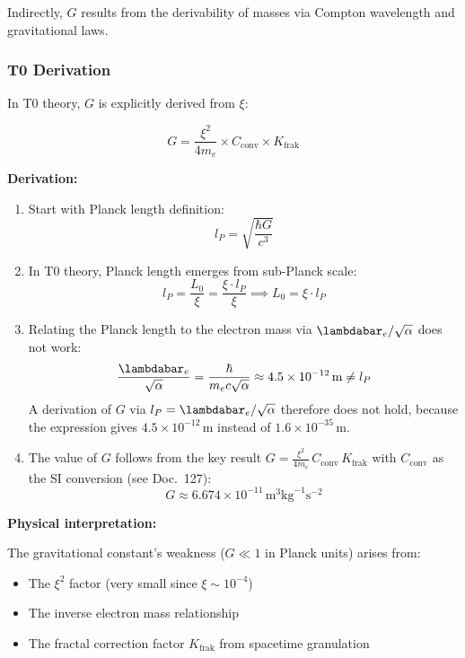 	Indirectly, $G$ results from the derivability of masses via Compton wavelength and gravitational laws.
	
	\subsubsection{T0 Derivation}
	
	In T0 theory, $G$ is explicitly derived from $\xi$:
	
	\begin{keyresult}
		\[
		G = \frac{\xi^2}{4 m_e} \times C_{\text{conv}} \times K_{\text{frak}}
		\]
	\end{keyresult}
	
	\textbf{Derivation:}
	
	\begin{enumerate}
		\item Start with Planck length definition:
		\[
		l_P = \sqrt{\frac{\hbar G}{c^3}}
		\]
		
		\item In T0 theory, Planck length emerges from sub-Planck scale:
		\[
		l_P = \frac{L_0}{\xi} = \frac{\xi \cdot l_P}{\xi} \implies L_0 = \xi \cdot l_P
		\]
		
		\item Relating the Planck length to the electron mass via $\lambdabar_e/\sqrt{\alpha}$ does not work:
		\[
		\frac{\lambdabar_e}{\sqrt{\alpha}} = \frac{\hbar}{m_e c \sqrt{\alpha}} \approx 4.5\times10^{-12}\,\text{m} \neq l_P
		\]
		A derivation of $G$ via $l_P = \lambdabar_e/\sqrt{\alpha}$ therefore does not hold, because the expression gives $4.5\times10^{-12}$\,m instead of $1.6\times10^{-35}$\,m.
		
		\item The value of $G$ follows from the key result $G=\frac{\xi^2}{4m_e}\,C_{\text{conv}}\,K_{\text{frak}}$ with $C_{\text{conv}}$ as the SI conversion (see Doc.~127):
		\[
		G \approx 6.674 \times 10^{-11}\,\text{m}^3\text{kg}^{-1}\text{s}^{-2}
		\]
	\end{enumerate}
	
	\textbf{Physical interpretation:}
	
	The gravitational constant's weakness ($G \ll 1$ in Planck units) arises from:
	\begin{itemize}
		\item The $\xi^2$ factor (very small since $\xi \sim 10^{-4}$)
		\item The inverse electron mass relationship
		\item The fractal correction factor $K_{\text{frak}}$ from spacetime granulation
	\end{itemize}
	
